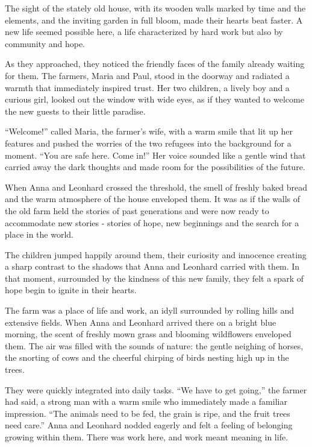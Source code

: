 \documentclass[
]{article}
\begin{document}
The sight of the stately old house, with its wooden walls marked by time
and the elements, and the inviting garden in full bloom, made their
hearts beat faster. A new life seemed possible here, a life
characterized by hard work but also by community and hope.

As they approached, they noticed the friendly faces of the family
already waiting for them. The farmers, Maria and Paul, stood in the
doorway and radiated a warmth that immediately inspired trust. Her two
children, a lively boy and a curious girl, looked out the window with
wide eyes, as if they wanted to welcome the new guests to their little
paradise.

``Welcome!'' called Maria, the farmer's wife, with a warm smile that lit
up her features and pushed the worries of the two refugees into the
background for a moment. ``You are safe here. Come in!'' Her voice
sounded like a gentle wind that carried away the dark thoughts and made
room for the possibilities of the future.

When Anna and Leonhard crossed the threshold, the smell of freshly baked
bread and the warm atmosphere of the house enveloped them. It was as if
the walls of the old farm held the stories of past generations and were
now ready to accommodate new stories - stories of hope, new beginnings
and the search for a place in the world.

The children jumped happily around them, their curiosity and innocence
creating a sharp contrast to the shadows that Anna and Leonhard carried
with them. In that moment, surrounded by the kindness of this new
family, they felt a spark of hope begin to ignite in their hearts.

The farm was a place of life and work, an idyll surrounded by rolling
hills and extensive fields. When Anna and Leonhard arrived there on a
bright blue morning, the scent of freshly mown grass and blooming
wildflowers enveloped them. The air was filled with the sounds of
nature: the gentle neighing of horses, the snorting of cows and the
cheerful chirping of birds nesting high up in the trees.

They were quickly integrated into daily tasks. ``We have to get going,''
the farmer had said, a strong man with a warm smile who immediately made
a familiar impression. ``The animals need to be fed, the grain is ripe,
and the fruit trees need care.'' Anna and Leonhard nodded eagerly and
felt a feeling of belonging growing within them. There was work here,
and work meant meaning in life.
\end{document}
